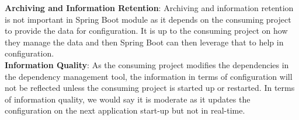 \textbf{Archiving and Information Retention}: Archiving and information retention is not important in Spring Boot module as it depends on the consuming project to provide the data for configuration. It is up to the consuming project on how they manage the data and then Spring Boot can then leverage that to help in configuration.\\

\textbf{Information Quality}: As the consuming project modifies the dependencies in the dependency management tool, the information in terms of configuration will not be reflected unless the consuming project is started up or restarted. In terms of information quality, we would say it is moderate as it updates the configuration on the next application start-up but not in real-time.
